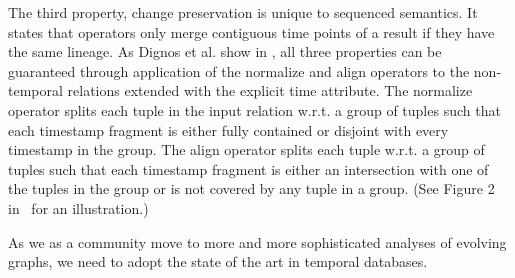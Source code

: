 The third property, change preservation is unique to sequenced
semantics.  It states that operators only merge contiguous time points
of a result if they have the same lineage.  As Dignos et al. show in
\cite{Dignos2012}, all three properties can be guaranteed through
application of the normalize and align operators to the non-temporal
relations extended with the explicit time attribute.  The normalize
operator splits each tuple in the input relation w.r.t. a group of
tuples such that each timestamp fragment is either fully contained or
disjoint with every timestamp in the group.  The align operator splits
each tuple w.r.t. a group of tuples such that each timestamp fragment
is either an intersection with one of the tuples in the group or is
not covered by any tuple in a group. (See Figure 2
in~\cite{Dignos2012} for an illustration.)

As we as a community move to more and more sophisticated analyses of
evolving graphs, we need to adopt the state of the art in temporal
databases.
